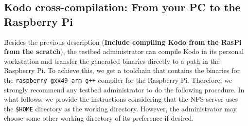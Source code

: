 \subsection{Kodo cross-compilation: From your PC to the Raspberry Pi}

Besides the previous description (\textbf{Include compiling Kodo from the
RasPi from the scratch}), the testbed administrator can compile Kodo in its
personal workstation and transfer the generated binaries directly to
a path in the Raspberry Pi. To achieve this, we get a toolchain that
contains the binaries for the \texttt{raspberry-gxx49-arm-g++} compiler
for the Raspberry Pi. Therefore, we strongly recommend any testbed
administrator to do the following procedure. In what follows, we provide
the instructions considering that the NFS server uses the \texttt{\$HOME}
directory as the working directory. However, the administrator may choose
some other working directory of its preference if desired.

